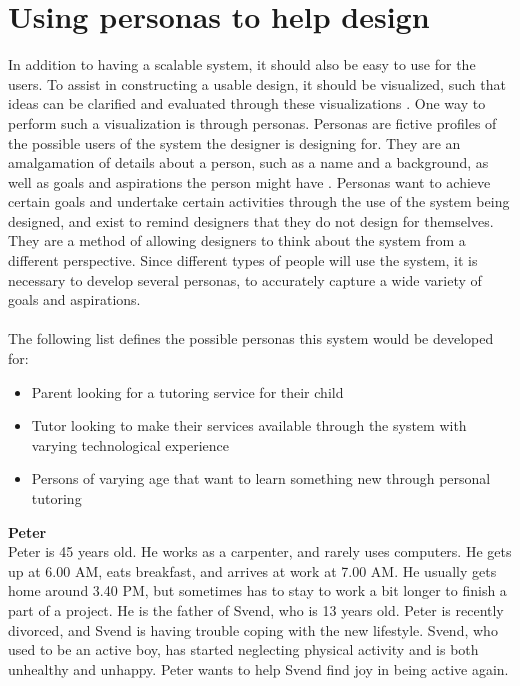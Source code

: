 \section{Using personas to help design}\label{sec:personas}
In addition to having a scalable system, it should also be easy to use for the users.
To assist in constructing a usable design, it should be visualized, such that ideas can be clarified and evaluated through these visualizations \cite{DEB}.
One way to perform such a visualization is through personas.
Personas are fictive profiles of the possible users of the system the designer is designing for.
They are an amalgamation of details about a person, such as a name and a background, as well as goals and aspirations the person might have \cite{DEB}.
Personas want to achieve certain goals and undertake certain activities through the use of the system being designed, and exist to remind designers that they do not design for themselves.
They are a method of allowing designers to think about the system from a different perspective.
Since different types of people will use the system, it is necessary to develop several personas, to accurately capture a wide variety of goals and aspirations.
\\\\
The following list defines the possible personas this system would be developed for:
\begin{itemize}
    \item Parent looking for a tutoring service for their child
    \item Tutor looking to make their services available through the system with varying technological experience
    \item Persons of varying age that want to learn something new through personal tutoring
\end{itemize}
\noindent
\textbf{Peter}
\\
Peter is 45 years old.
He works as a carpenter, and rarely uses computers.
He gets up at 6.00 AM, eats breakfast, and arrives at work at 7.00 AM.
He usually gets home around 3.40 PM, but sometimes has to stay to work a bit longer to finish a part of a project.
He is the father of Svend, who is 13 years old.
Peter is recently divorced, and Svend is having trouble coping with the new lifestyle.
Svend, who used to be an active boy, has started neglecting physical activity and is both unhealthy and unhappy.
Peter wants to help Svend find joy in being active again. 
\\\\
